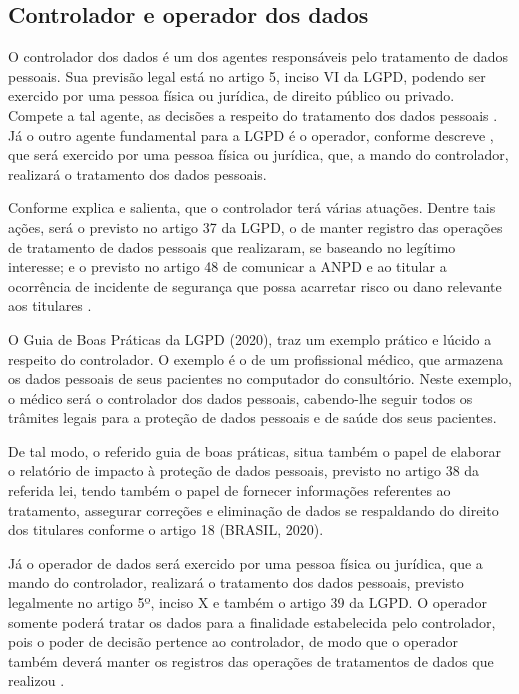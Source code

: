 \documentclass[
	12pt,				%
	openright,			%
	oneside,			%
	a4paper,			%
	english,			%
	french,				%
	spanish,			%
	brazil,				%
	]{abntex2}
\begin{document}
\subsection{Controlador e operador dos dados}

O controlador dos dados é um dos agentes responsáveis pelo tratamento de dados pessoais. Sua previsão legal está no artigo 5, inciso VI da LGPD, podendo ser exercido por uma pessoa física ou jurídica, de direito público ou privado. Compete a tal agente, as decisões a respeito do tratamento dos dados pessoais \cite{01-01-LeiGeral}. Já o outro agente fundamental para a LGPD é o operador, conforme descreve \cite{Pohlmann2019}, que será exercido por uma pessoa física ou jurídica, que, a mando do controlador, realizará o tratamento dos dados pessoais.

Conforme  explica e salienta, que o controlador terá várias atuações. Dentre tais ações, será o previsto no artigo 37 da LGPD, o de manter registro das operações de tratamento de dados pessoais que realizaram, se baseando no legítimo interesse; e o previsto no artigo 48 de comunicar a ANPD e ao titular a ocorrência de incidente de segurança que possa acarretar risco ou dano relevante aos titulares \cite{01-01-LeiGeral}. 

O Guia de Boas Práticas da LGPD (2020), traz um exemplo prático e lúcido a respeito do controlador. O exemplo é o de um profissional médico, que armazena os dados pessoais de seus pacientes no computador do consultório. Neste exemplo, o médico será o controlador dos dados pessoais, cabendo-lhe seguir todos os trâmites legais para a proteção de dados pessoais e de saúde dos seus pacientes.

De tal modo, o referido guia de boas práticas, situa também o papel de elaborar o relatório de impacto à proteção de dados pessoais, previsto no artigo 38 da referida lei, tendo também o papel de fornecer informações referentes ao tratamento, assegurar correções e eliminação de dados se respaldando do direito dos titulares conforme o artigo 18 (BRASIL, 2020).
\pagebreak


Já o operador de dados será exercido por uma pessoa física ou jurídica, que a mando do controlador, realizará o tratamento dos dados pessoais, previsto legalmente no artigo 5º, inciso X e também o artigo 39 da LGPD. O operador somente poderá tratar os dados para a finalidade estabelecida pelo controlador, pois o poder de decisão pertence ao controlador, de modo que o operador também deverá manter os registros das operações de tratamentos de dados que realizou \cite{01-01-LeiGeral}.
\end{document}
